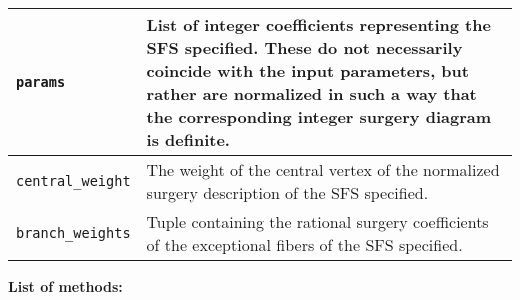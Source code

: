 \documentclass[12pt]{amsart}
\theoremstyle{definition}
\theoremstyle{remark}
\numberwithin{equation}{section}
\begin{document}
\renewcommand{\arraystretch}{1.5}%
\begin{tabularx}{\linewidth}{X X}
\hline
\texttt{params} & List of integer coefficients representing the SFS specified. These do not necessarily coincide with the input parameters, but rather are normalized in such a way that the corresponding integer surgery diagram is definite.\\
\hline
\texttt{central\_weight} & The weight of the central vertex of the normalized surgery description of the SFS specified.\\
\hline
\texttt{branch\_weights} & Tuple containing the rational surgery coefficients of the exceptional fibers of the SFS specified.\\
\hline
\end{tabularx}

\newpage

\textbf{List of methods:}
\end{document}
